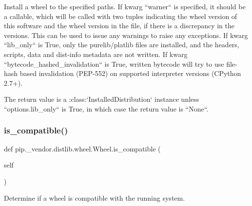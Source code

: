\begin{DoxyVerb}Install a wheel to the specified paths. If kwarg ``warner`` is
specified, it should be a callable, which will be called with two
tuples indicating the wheel version of this software and the wheel
version in the file, if there is a discrepancy in the versions.
This can be used to issue any warnings to raise any exceptions.
If kwarg ``lib_only`` is True, only the purelib/platlib files are
installed, and the headers, scripts, data and dist-info metadata are
not written. If kwarg ``bytecode_hashed_invalidation`` is True, written
bytecode will try to use file-hash based invalidation (PEP-552) on
supported interpreter versions (CPython 2.7+).

The return value is a :class:`InstalledDistribution` instance unless
``options.lib_only`` is True, in which case the return value is ``None``.
\end{DoxyVerb}
 \mbox{\label{classpip_1_1__vendor_1_1distlib_1_1wheel_1_1Wheel_adda0c357fe3d41a65ae43d8e9e2a5e82}} 
\subsubsection{\texorpdfstring{is\+\_\+compatible()}{is\_compatible()}}
{\footnotesize\ttfamily def pip.\+\_\+vendor.\+distlib.\+wheel.\+Wheel.\+is\+\_\+compatible (\begin{DoxyParamCaption}\item[{}]{self }\end{DoxyParamCaption})}

\begin{DoxyVerb}Determine if a wheel is compatible with the running system.
\end{DoxyVerb}
 \mbox{\label{classpip_1_1__vendor_1_1distlib_1_1wheel_1_1Wheel_ac425a3d38c3af5b9a05584d68db70f29}} 
